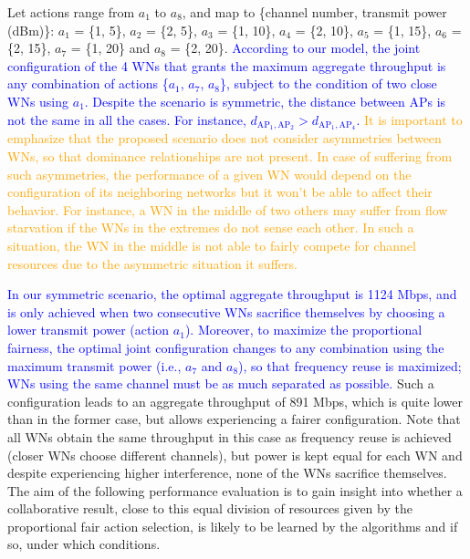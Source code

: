\documentclass[preprint,12pt]{elsarticle}
\newcommand{\francesc}[1]{\textcolor{blue}{#1}}
\newcommand{\francesco}[1]{\textcolor{orange}{#1}}
\begin{document}
Let actions range from $a_1$ to $a_8$, and map to \{channel number, transmit power (dBm)\}: $a_1$ = \{1, 5\}, $a_2$ = \{2, 5\}, $a_3$ = \{1, 10\}, $a_4$ = \{2, 10\}, $a_5$ = \{1, 15\}, $a_6$ = \{2, 15\}, $a_7$ = \{1, 20\} and $a_8$ = \{2, 20\}. \francesc{According to our model, the joint configuration of the 4 WNs that grants the maximum aggregate throughput is any combination of actions \{$a_1$, $a_7$, $a_8$\}, subject to the condition of two close WNs using $a_1$. Despite the scenario is symmetric, the distance between APs is not the same in all the cases. For instance, $d_{\text{AP}_1,\text{AP}_2} > d_{\text{AP}_1,\text{AP}_4}$.} \francesco{It is important to emphasize that the proposed scenario does not consider asymmetries between WNs, so that dominance relationships are not present. In case of suffering from such asymmetries, the performance of a given WN would depend on the configuration of its neighboring networks but it won't be able to affect their behavior. For instance, a WN in the middle of two others may suffer from flow starvation if the WNs in the extremes do not sense each other. In such a situation, the WN in the middle is not able to fairly compete for channel resources due to the asymmetric situation it suffers.}
	
\francesc{In our symmetric scenario, the optimal aggregate throughput is 1124 Mbps, and is only achieved when two consecutive WNs sacrifice themselves by choosing a lower transmit power (action $a_1$). Moreover, to maximize the proportional fairness, the optimal joint configuration changes to any combination using the maximum transmit power (i.e., $a_7$ and $a_8$), so that frequency reuse is maximized; WNs using the same channel must be as much separated as possible.} Such a configuration leads to an aggregate throughput of 891 Mbps, which is quite lower than in the former case, but allows experiencing a fairer configuration. Note that all WNs obtain the same throughput in this case as frequency reuse is achieved (closer WNs choose different channels), but power is kept equal for each WN and despite experiencing higher interference, none of the WNs sacrifice themselves. The aim of the following performance evaluation is to gain insight into whether a collaborative result, close to this equal division of resources given by the proportional fair action selection, is likely to be learned by the algorithms and if so, under which conditions.

\end{document}

